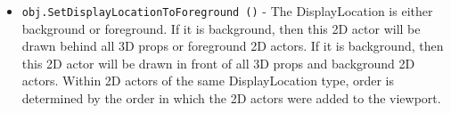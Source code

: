 \begin{itemize}
\item  \verb|obj.SetDisplayLocationToForeground ()| -  The DisplayLocation is either background or foreground.
 If it is background, then this 2D actor will be drawn
 behind all 3D props or foreground 2D actors. If it is
 background, then this 2D actor will be drawn in front of
 all 3D props and background 2D actors. Within 2D actors
 of the same DisplayLocation type, order is determined by
 the order in which the 2D actors were added to the viewport.

\end{itemize}
